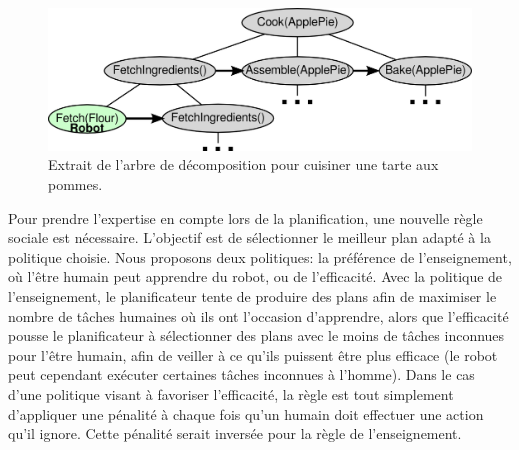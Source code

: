 \documentclass[a4paper,11pt,twoside]{StyleThese}
\begin{document}
\begin{figure}[ht!]
 \centering
  \includegraphics[width=0.47
 \textwidth]{img/plan.png}
 \caption{Extrait de l'arbre de décomposition pour cuisiner une tarte aux pommes.}
 \label{fig:treePlan}
   \vspace{-20pt}
 \end{figure}
 
Pour prendre l'expertise en compte lors de la planification, une nouvelle règle sociale est nécessaire. L'objectif est de sélectionner le meilleur plan adapté à la politique choisie. Nous proposons deux politiques: la préférence de l'enseignement, où l'être humain peut apprendre du robot, ou de l'efficacité. Avec la politique de l'enseignement, le planificateur tente de produire des plans afin de maximiser le nombre de tâches humaines où ils ont l'occasion d'apprendre, alors que l'efficacité pousse le planificateur à sélectionner des plans avec le moins de tâches inconnues pour l'être humain, afin de veiller à ce qu'ils puissent être plus efficace (le robot peut cependant exécuter certaines tâches inconnues à l'homme).
Dans le cas d'une politique visant à favoriser l'efficacité, la règle est tout simplement d'appliquer une pénalité à chaque fois qu'un humain doit effectuer une action qu'il ignore. Cette pénalité serait inversée pour la règle de l'enseignement.
\end{document}
